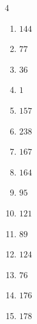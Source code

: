 \begin{multicols}{4}
\begin{enumerate}

  \item $144$


  \item $77$


  \item $36$


  \item $1$


  \item $157$


  \item $238$


\columnbreak %

  \item $167$


  \item $164$


  \item $95$


  \item $121$


  \item $89$


  \item $124$


  \item $76$


  \item $176$


  \item $178$



\end{enumerate}
\end{multicols}

